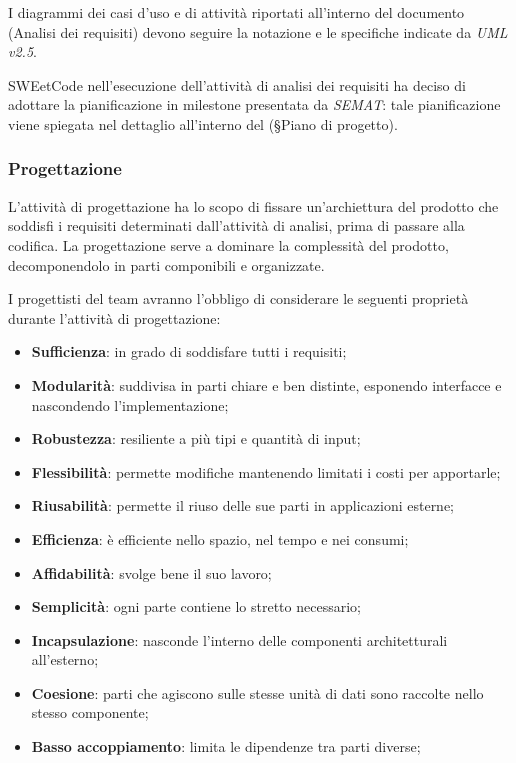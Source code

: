 \documentclass[10pt, a4paper]{article}
\begin{document}
I diagrammi dei casi d'uso e di attività riportati all'interno del documento (Analisi dei requisiti) devono seguire la notazione e le specifiche indicate da \textit{UML v2.5}.

SWEetCode nell'esecuzione dell'attività di analisi dei requisiti ha deciso di adottare la pianificazione in milestone presentata 
da \textit{SEMAT}: tale pianificazione viene spiegata nel dettaglio all'interno del (\S Piano di progetto).

\subsubsection{Progettazione}
L'attività di progettazione ha lo scopo di fissare un'archiettura del prodotto che soddisfi i requisiti determinati dall'attività di analisi, prima di passare alla codifica.
La progettazione serve a dominare la complessità del prodotto, decomponendolo in parti componibili e organizzate.

I progettisti del team avranno l'obbligo di considerare le seguenti proprietà durante l'attività di progettazione:
\begin{itemize}
    \item \textbf{Sufficienza}: in grado di soddisfare tutti i requisiti;
    \item \textbf{Modularità}: suddivisa in parti chiare e ben distinte, esponendo interfacce e nascondendo l'implementazione;
    \item \textbf{Robustezza}: resiliente a più tipi e quantità di input;
    \item \textbf{Flessibilità}: permette modifiche mantenendo limitati i costi per apportarle;
    \item \textbf{Riusabilità}: permette il riuso delle sue parti in applicazioni esterne;
    \item \textbf{Efficienza}: è efficiente nello spazio, nel tempo e nei consumi;
    \item \textbf{Affidabilità}: svolge bene il suo lavoro;
    \item \textbf{Semplicità}: ogni parte contiene lo stretto necessario;
    \item \textbf{Incapsulazione}: nasconde l'interno delle componenti architetturali all'esterno;
    \item \textbf{Coesione}: parti che agiscono sulle stesse unità di dati sono raccolte nello stesso componente;
    \item \textbf{Basso accoppiamento}: limita le dipendenze tra parti diverse;
\end{itemize}
\end{document}
